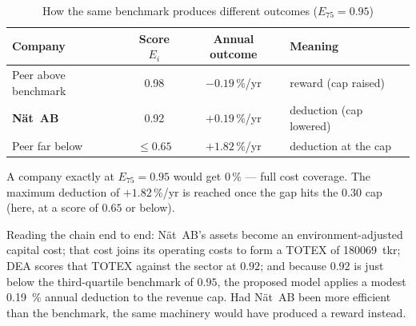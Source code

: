 \begin{table}[H]
\centering
\footnotesize
\begin{threeparttable}
\caption{How the same benchmark produces different outcomes ($E_{75}=0.95$)}
\label{tab:example-outcomes}
\begin{tabular}{@{}lccl@{}}
\toprule
\textbf{Company} & \textbf{Score $E_i$} & \textbf{Annual outcome} & \textbf{Meaning} \\
\midrule
Peer above benchmark   & 0.98 & $-0.19\,\%$/yr & reward (cap raised) \\
\textbf{Nät~AB}        & 0.92 & $+0.19\,\%$/yr & deduction (cap lowered) \\
Peer far below         & $\le 0.65$ & $+1.82\,\%$/yr & deduction at the cap \\
\bottomrule
\end{tabular}
\begin{tablenotes}
\item A company exactly at $E_{75}=0.95$ would get $0\,\%$ --- full cost coverage.
The maximum deduction of $+1.82\,\%$/yr is reached once the gap hits the
$0.30$ cap (here, at a score of $0.65$ or below).
\end{tablenotes}
\end{threeparttable}
\end{table}

Reading the chain end to end: Nät~AB's assets become an environment-adjusted
capital cost; that cost joins its operating costs to form a TOTEX of
\SI{180069}{tkr}; DEA scores that TOTEX against the sector at $0.92$; and because
$0.92$ is just below the third-quartile benchmark of $0.95$, the proposed model
applies a modest \SI{0.19}{\percent} annual deduction to the revenue cap. Had
Nät~AB been more efficient than the benchmark, the same machinery would have
produced a reward instead.
